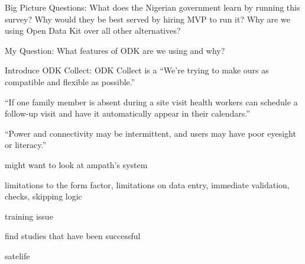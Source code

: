 Big Picture Questions: What does the Nigerian government learn by
running this survey? Why would they be best served by hiring MVP to
run it? Why are we using Open Data Kit over all other alternatives?

My Question: What features of ODK are we using and why?

Introduce ODK Collect: ODK Collect is a 
``We're trying to make ours as compatible and flexible as possible.''

``If one family member is absent during a site visit health workers
can schedule a follow-up visit and have it automatically appear in
their calendars.''

``Power and connectivity may be intermittent, and users may have poor
eyesight or literacy.''

might want to look at ampath's system


limitations to the form factor, limitations on data entry, immediate validation, checks, skipping logic

training issue

find studies that have been successful

satelife
